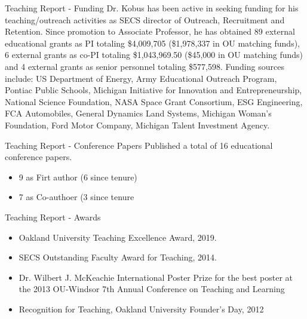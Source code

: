 \documentclass{beamer}
\begin{document}
\begin{frame}{Teaching Report - Funding}
Dr. Kobus has been active in seeking funding for his teaching/outreach activities as SECS director of Outreach, Recruitment and Retention. Since promotion to Associate Professor, he has obtained 89 external educational grants as PI totaling \$4,009,705 
(\$1,978,337 in OU matching funds), 6 external grants as co-PI totaling \$1,043,969.50 (\$45,000 in OU matching funds) 
and 4 external grants as senior personnel totaling \$577,598. 
Funding sources include: US Department of Energy, Army Educational Outreach Program, 
Pontiac Public Schools, Michigan Initiative for Innovation and Entrepreneurship, 
National Science Foundation, NASA Space Grant Consortium, ESG Engineering, FCA Automobiles, General Dynamics Land Systems, Michigan Woman’s Foundation, Ford Motor Company, Michigan Talent Investment Agency.
\end{frame}

\begin{frame}{Teaching Report - Conference Papers}
Published a total of 16 educational conference papers. 
\begin{itemize}
  \item 9 as Firt author (6 since tenure)
  \item 7 as Co-authoer (3 since tenure
\end{itemize}

\end{frame}

\begin{frame}{Teaching Report - Awards} 
\begin{itemize}
  \item Oakland University Teaching Excellence Award, 2019. 
  \item SECS Outstanding Faculty Award for Teaching, 2014.
  \item Dr. Wilbert J. McKeachie International Poster Prize for the best poster at the 2013 OU-Windsor 7th Annual Conference on Teaching and Learning 
  \item Recognition for Teaching, Oakland University Founder’s Day, 2012
\end{itemize}

\end{frame}
\end{document}
